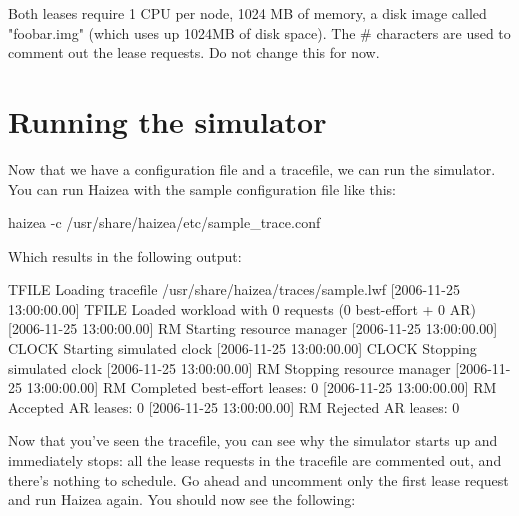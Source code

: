 Both leases require 1 CPU per node, 1024 MB of memory, a disk image called "foobar.img" (which uses up 1024MB of disk space). The \# characters are used to comment out the lease requests. Do not change this for now.

\section{Running the simulator}

Now that we have a configuration file and a tracefile, we can run the simulator. You can run Haizea with the sample configuration file like this:

\begin{shellverbatim}
haizea -c /usr/share/haizea/etc/sample_trace.conf 
\end{shellverbatim}

Which results in the following output:

\begin{wideshellverbatim}
[2006-11-25 13:00:00.00] TFILE   Loading tracefile /usr/share/haizea/traces/sample.lwf
[2006-11-25 13:00:00.00] TFILE   Loaded workload with 0 requests (0 best-effort + 0 AR)
[2006-11-25 13:00:00.00] RM      Starting resource manager
[2006-11-25 13:00:00.00] CLOCK   Starting simulated clock
[2006-11-25 13:00:00.00] CLOCK   Stopping simulated clock
[2006-11-25 13:00:00.00] RM      Stopping resource manager
[2006-11-25 13:00:00.00] RM        Completed best-effort leases: 0
[2006-11-25 13:00:00.00] RM        Accepted AR leases: 0
[2006-11-25 13:00:00.00] RM        Rejected AR leases: 0
\end{wideshellverbatim}

Now that you've seen the tracefile, you can see why the simulator starts up and immediately stops: all the lease requests in the tracefile are commented out, and there's nothing to schedule. Go ahead and uncomment only the first lease request and run Haizea again. You should now see the following:

